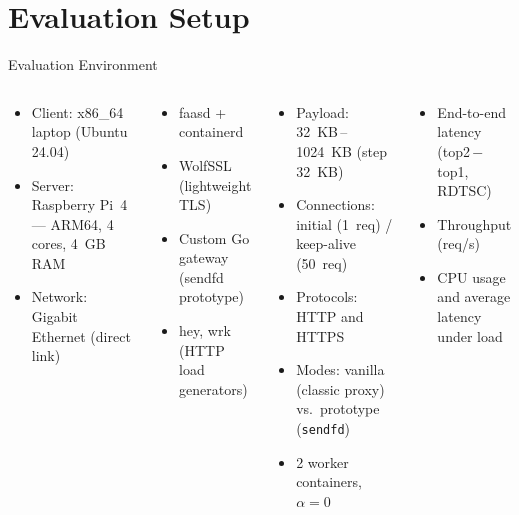 \documentclass[aspectratio=169]{beamer}
\begin{document}
\section{Evaluation Setup}

\begin{frame}{Evaluation Environment}
  \begin{columns}[T]
    \begin{tcolorbox}[infocard, title=Hardware]
      \begin{itemize}\setlength\itemsep{2pt}\small
        \item Client: x86\_64 laptop (Ubuntu 24.04)
        \item Server: Raspberry Pi~4 — ARM64, 4 cores, 4~GB RAM
        \item Network: Gigabit Ethernet (direct link)
      \end{itemize}
    \end{tcolorbox}\medskip
    \begin{tcolorbox}[infocard, title=Software Stack]
      \begin{itemize}\setlength\itemsep{2pt}\small
        \item faasd + containerd
        \item WolfSSL (lightweight TLS)
        \item Custom Go gateway (sendfd prototype)
        \item hey, wrk (HTTP load generators)
      \end{itemize}
    \end{tcolorbox}

    \begin{tcolorbox}[infocard, title=Benchmark Conditions]
      \begin{itemize}\setlength\itemsep{2pt}\small
        \item Payload: 32~KB\,--\,1024~KB (step 32~KB)
        \item Connections: initial (1~req) / keep-alive (50~req)
        \item Protocols: HTTP and HTTPS
        \item Modes: vanilla (classic proxy) vs.\ prototype (\texttt{sendfd})
        \item 2 worker containers, $\alpha = 0$
      \end{itemize}
    \end{tcolorbox}\medskip
    \begin{tcolorbox}[infocard, title=Measured Metrics]
      \begin{itemize}\setlength\itemsep{2pt}\small
        \item End-to-end latency (top2\,$-$\,top1, RDTSC)
        \item Throughput (req/s)
        \item CPU usage and average latency under load
      \end{itemize}
    \end{tcolorbox}
  \end{columns}
\end{frame}
\end{document}
